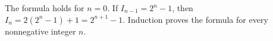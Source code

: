 The formula holds for $n=0$. If $I_{n-1}=2^n-1$, then $I_n=2(2^n-1)+1=2^{n+1}-1$. Induction proves the formula for every nonnegative integer $n$.
